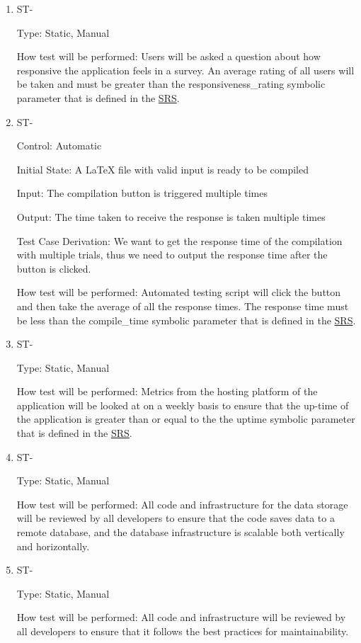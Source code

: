 \documentclass[12pt, titlepage]{article}
\newcounter{TESTID}
\newcommand\TESTNUM{\stepcounter{TESTID}\theTESTID}
\begin{document}
	\begin{enumerate}
		
		\item{ST-\TESTNUM\\}
		
		Type: Static, Manual
		
		How test will be performed: Users will be asked a question about how responsive the application feels in a survey. An average rating of all users will be taken and must be greater than the responsiveness\_rating symbolic parameter that is defined in the \href{https://github.com/RutheniumVI/UnderTree/blob/main/docs/SRS/SRS.pdf}{SRS}.
		
		\item{ST-\TESTNUM\\}
		
		Control: Automatic
		
		Initial State: A LaTeX file with valid input is ready to be compiled 
		
		Input: The compilation button is triggered multiple times
		
		Output: The time taken to receive the response is taken multiple times
		
		Test Case Derivation: We want to get the response time of the compilation with multiple trials, thus we need to output the response time after the button is clicked.
		
		How test will be performed: Automated testing script will click the button and then take the average of all the response times. The response time must be less than the compile\_time symbolic parameter that is defined in the \href{https://github.com/RutheniumVI/UnderTree/blob/main/docs/SRS/SRS.pdf}{SRS}.
		
		\item{ST-\TESTNUM\\}
		
		Type: Static, Manual
		
		How test will be performed: Metrics from the hosting platform of the application will be looked at on a weekly basis to ensure that the up-time of the application is greater than or equal to the the uptime symbolic parameter that is defined in the \href{https://github.com/RutheniumVI/UnderTree/blob/main/docs/SRS/SRS.pdf}{SRS}.
		
		\item{ST-\TESTNUM\\}
		
		Type: Static, Manual
		
		How test will be performed: All code and infrastructure for the data storage will be reviewed by all developers to ensure that the code saves data to a remote database, and the database infrastructure is scalable both vertically and horizontally.
		
		\item{ST-\TESTNUM\\}
		
		Type: Static, Manual
		
		How test will be performed: All code and infrastructure will be reviewed by all developers to ensure that it follows the best practices for maintainability.
		
	\end{enumerate}
\end{document}

